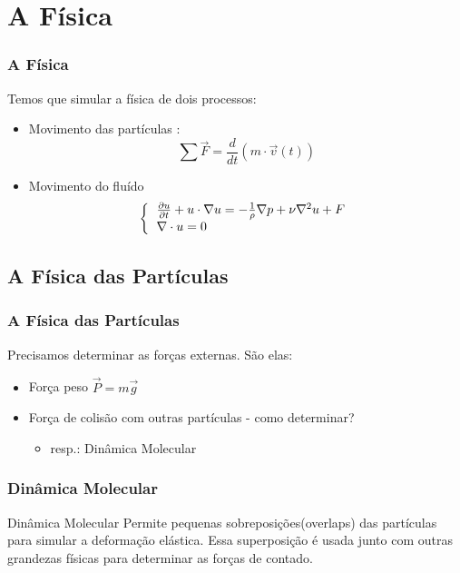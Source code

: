 \documentclass{beamer}
\begin{document}
\section{A Física}
\begin{frame}{}
	\frametitle{A Física}
Temos que simular a física de dois processos:
  \begin{itemize}
    \item<2-> Movimento das partículas : 
    \begin{equation}
        \sum \vec{F} = \frac{d}{dt} ( m \cdot \vec{v}(t) )
    \end{equation} 
    \item<3-> Movimento do fluído
    \begin{equation}
		\left\lbrace \begin{tabular}{ll}
				$\frac{\partial u}{\partial t} + u \cdot \nabla u = -\frac{1}{\rho}\nabla p +\nu \nabla ^2 u + F$ \\
				$\nabla \cdot u = 0$
					\end{tabular}		 \right.
    \end{equation} 

  \end{itemize}
\end{frame}

\subsection{A Física das Partículas}
\begin{frame}
	\frametitle{A Física das Partículas}
	Precisamos determinar as forças externas. São elas:
	\begin{itemize}
		\item<2-> Força peso $\vec{P} = m\vec{g}$
		\item<3-> Força de colisão com outras partículas - como determinar?
			\begin{itemize}
				 \item<4-> resp.: Dinâmica Molecular
			\end{itemize}
	\end{itemize}
\end{frame}
\begin{frame}
	\frametitle{Dinâmica Molecular}
	\begin{block}{Dinâmica Molecular}
			Permite pequenas sobreposições(overlaps) das partículas para simular a deformação elástica. Essa superposição é usada junto com outras grandezas físicas para determinar as forças de contado.
	\end{block}
\end{frame}
\end{document}
